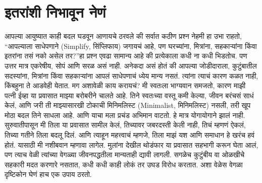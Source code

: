  \chapter{इतरांशी निभावून नेणं}
आपल्या आयुष्यात काही बदल घडवून आणायचे ठरवले की सर्वात कठीण प्रश्न नेहमी हा उभा राहतो,  ``आपल्याला साधेपणाने (Simplify,  सिंप्लिफाय) जगायचं आहे, पण घरच्यांना, मित्रांना, सहकाऱ्यांना किंवा इतरांना तसं नको असेल तर?''हा प्रश्न एवढा सामान्य आहे की प्रत्येकाला कधी ना कधी भिडतोच. पण उत्तर मात्र एकरेषीय, सोपं आणि सरळ असं नाही.
अनेकदा असं होतं की आपल्या जोडीदाराला, कुटुंबातील सदस्यांना, मित्रांना किंवा सहकाऱ्यांना आपलं साधेपणाचं ध्येय मान्य नसतं. त्यांना त्याचं कारण कळत नाही, किंबहुना ते आडवेही येतात. मग अशावेळी काय करायचं?
मी स्वतःला भाग्यवान समजतो, कारण माझी पत्नी ईव्हा या प्रवासात माझ्या बरोबरीने चालते आहे. तिने स्वतःच्या वस्तू कमी केल्या, जीवन बरंचसं साधं केलं, आणि जरी ती माझ्यासारखी टोकाची मिनिमलिस्ट (Minimalist,  मिनिमलिस्ट) नसली, तरी खूप मोठा बदल तिने साधला आहे. आणि याचा मला प्रचंड अभिमान वाटतो.
हे मात्र योगायोगाने झालं नाही. सुरुवातीपासून मी तिला या प्रवासात सामील केलं, तिच्यावर जबरदस्ती केली नाही,
 तिचं म्हणणं ऐकलं, तिच्या गतीने तिला बदलू दिलं. आणि त्याहून महत्त्वाचं म्हणजे,  तिला माझं यश आणि समाधान हे खरंच हवं होतं. यासाठी मी नशीबवान म्हणावा लागेल. मुलांना देखील थोडंफार या प्रवासात सहभागी करून घेता आलं,
 पण त्याच वेळी त्यांच्या वेगळ्या जीवनपद्धतीला मान्यताही द्यावी लागली. सगळेच कुटुंबीय वा ओळखीचे सहकारी मदत करणारे नसतात, कधी कधी काही लोकं तर उघड विरोध करतात. अशा वेळेस वेगळा दृष्टिकोन घेणं हाच एक उपाय ठरतो.

